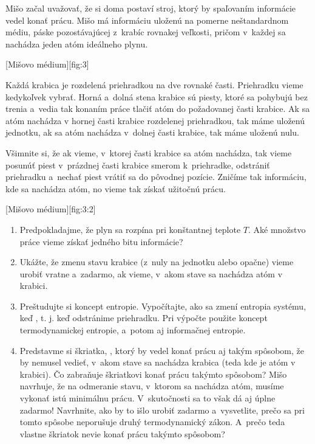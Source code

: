 Mišo začal uvažovať, že si doma postaví stroj, ktorý by spaľovaním informácie vedel konať prácu.
Mišo má informáciu uloženú na pomerne neštandardnom médiu, páske pozostávajúcej z~krabíc rovnakej veľkosti,
pričom v~každej sa nachádza jeden atóm ideálneho plynu.

[Mišovo médium][fig:3]

Každá krabica je rozdelená priehradkou na dve rovnaké časti. Priehradku vieme kedykoľvek vybrať.
Horná a~dolná stena krabice sú piesty, ktoré sa pohybujú bez trenia a~vedia tak konaním práce tlačiť
atóm do požadovanej časti krabice. Ak sa atóm nachádza v hornej časti krabice rozdelenej priehradkou,
tak máme uloženú jednotku, ak sa atóm nachádza v~dolnej časti krabice, tak máme uloženú nulu. 
 
Všimnite si, že ak vieme, v~ktorej časti krabice sa atóm nachádza, tak vieme posunúť piest v~prázdnej
časti krabice smerom k~priehradke, odstrániť priehradku a~nechať piest vrátiť sa do pôvodnej pozície.
Zničíme tak informáciu, kde sa nachádza atóm, no vieme tak získať užitočnú prácu.

[Mišovo médium][fig:3:2]

\begin{enumerate}
	\item Predpokladajme, že plyn sa rozpína pri konštantnej teplote $T$.
		Aké množstvo práce vieme získať  jedného bitu informácie?
	\item Ukážte, že zmenu stavu krabice (z~nuly na jednotku alebo opačne) vieme urobiť vratne a~zadarmo,
		ak vieme, v~akom stave sa nachádza atóm v krabici.
	\item Preštudujte si koncept entropie. Vypočítajte, ako sa zmení entropia systému,
		keď , t. j. keď odstránime priehradku. Pri výpočte použite koncept
		termodynamickej entropie, a~potom aj informačnej entropie.
	\item Predstavme si škriatka, , ktorý by vedel konať prácu aj takým spôsobom,
		že by nemusel vedieť, v~akom stave sa nachádza krabica (teda kde je atóm v krabici).
		Čo zabraňuje škriatkovi konať prácu takýmto spôsobom? Mišo navrhuje, že na odmeranie stavu,
		v~ktorom sa nachádza atóm, musíme vykonať istú minimálnu prácu. V~skutočnosti sa to však dá aj úplne zadarmo!
		Navrhnite, ako by to išlo urobiť zadarmo a~vysvetlite, prečo sa pri tomto spôsobe neporušuje druhý
		termodynamický zákon. A~prečo teda vlastne škriatok nevie konať prácu takýmto spôsobom?
\end{enumerate}
